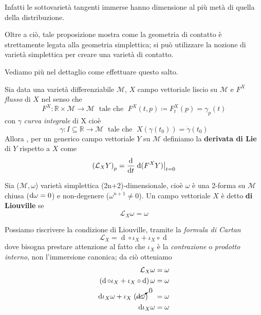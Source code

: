 Infatti le sottovarietà tangenti immerse hanno dimensione al più metà di quella della distribuzione.

Oltre a ciò, tale proposizione mostra come la geometria di contatto è strettamente legata alla geometria simplettica; si può utilizzare la nozione di varietà simplettica per creare una varietà di contatto.

Vediamo più nel dettaglio come effettuare questo salto.

Sia data una varietà differenziabile $\mathcal{M}$, $X$ campo vettoriale liscio su $\mathcal{M}$ e $F^X$ \emph{flusso} di $X$ nel senso \cite{latini_riemannian} che
\[
    F^X : \mathbb{R} \times \mathcal{M} \longrightarrow \mathcal{M} \; \text{ tale che } \; F^X(t, p) \coloneqq F^X_t(p) = \gamma_p (t)
\]
con $\gamma$ \emph{curva integrale} di X cioè
\[
    \gamma : I \subseteq \mathbb{R} \longrightarrow \mathcal{M} \; \text{ tale che } \; X(\gamma(t_0))=\dot\gamma (t_0)
\]
Allora \cite{lee_manifolds}, per un generico campo vettoriale $Y$ su $\mathcal{M}$ definiamo la \textbf{derivata di Lie} di $Y$ rispetto a $X$ come
\begin{equation}
    \left(\mathcal{L}_X Y\right)_p = \odv{}{t} \left.\odif{(F^X Y)}\right|_{t=0}
\end{equation}

\begin{definition}
    \cite{geiges_contact} Sia ($\mathcal{M}, \omega$) varietà simplettica (2n+2)-dimensionale, cioè $\omega$ è una 2-forma su $\mathcal{M}$ chiusa ($\odif{\omega} = 0$) e non-degenere ($\omega^{n+1} \neq 0$). Un campo vettoriale $X$ è detto \textbf{di Liouville} se
    \begin{equation}
        \mathcal{L}_X \omega = \omega
    \end{equation}
\end{definition}

Possiamo riscrivere la condizione di Liouville, tramite la \emph{formula di Cartan}
\begin{equation}
    \mathcal{L}_X = \operatorname{d} \circ \iota_X + \iota_X \circ \operatorname{d}
\end{equation}
dove bisogna prestare attenzione al fatto che $\iota_X$ è la \emph{contrazione} o \emph{prodotto interno}, non l'immersione canonica; da ciò otteniamo
\begin{align*}
    \mathcal{L}_X \omega                                                                  & = \omega \\
    \left( \operatorname{d} \circ \iota_X + \iota_X \circ \operatorname{d} \right) \omega & = \omega \\
    \odif{\iota_X \omega} + \iota_X \; (\cancelto{0}{\odif{\omega}} ) \quad               & = \omega \\
    \odif{\iota_X \omega}                                                                 & = \omega
\end{align*}


